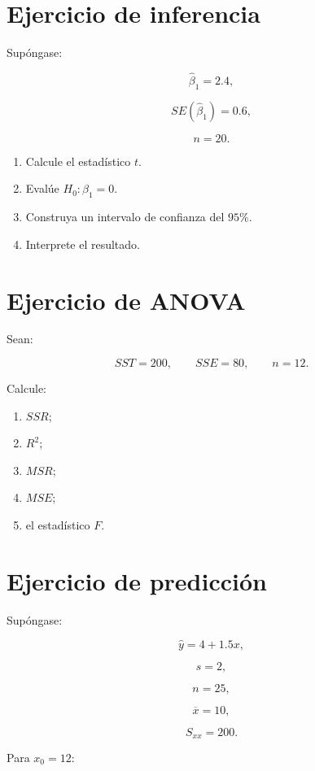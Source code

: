 \documentclass[
  spanish,
  11pt,
  letterpaper,
  DIV=11,
  numbers=noendperiod]{scrreprt}
\providecommand{\tightlist}{%
  \setlength{\itemsep}{0pt}\setlength{\parskip}{0pt}}
\theoremstyle{definition}
\theoremstyle{plain}
\theoremstyle{definition}
\theoremstyle{remark}
\begin{document}
\section{Ejercicio de inferencia}\label{ejercicio-de-inferencia}

Supóngase:

\[
\widehat{\beta}_1=2.4,
\]

\[
SE(\widehat{\beta}_1)=0.6,
\]

\[
n=20.
\]

\begin{enumerate}
\def\labelenumi{\arabic{enumi}.}
\tightlist
\item
  Calcule el estadístico \(t\).
\item
  Evalúe \(H_0:\beta_1=0\).
\item
  Construya un intervalo de confianza del \(95\%\).
\item
  Interprete el resultado.
\end{enumerate}

\section{Ejercicio de ANOVA}\label{ejercicio-de-anova}

Sean:

\[
SST=200,
\qquad
SSE=80,
\qquad
n=12.
\]

Calcule:

\begin{enumerate}
\def\labelenumi{\arabic{enumi}.}
\tightlist
\item
  \(SSR\);
\item
  \(R^2\);
\item
  \(MSR\);
\item
  \(MSE\);
\item
  el estadístico \(F\).
\end{enumerate}

\section{Ejercicio de predicción}\label{ejercicio-de-predicciuxf3n}

Supóngase:

\[
\widehat{y}
=
4+1.5x,
\]

\[
s=2,
\]

\[
n=25,
\]

\[
\overline{x}=10,
\]

\[
S_{xx}=200.
\]

Para \(x_0=12\):
\end{document}
